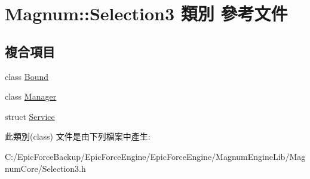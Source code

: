 \hypertarget{class_magnum_1_1_selection3}{}\section{Magnum\+:\+:Selection3 類別 參考文件}
\label{class_magnum_1_1_selection3}
\subsection*{複合項目}
\begin{DoxyCompactItemize}
\item 
class \hyperlink{class_magnum_1_1_selection3_1_1_bound}{Bound}
\item 
class \hyperlink{class_magnum_1_1_selection3_1_1_manager}{Manager}
\item 
struct \hyperlink{struct_magnum_1_1_selection3_1_1_service}{Service}
\end{DoxyCompactItemize}


此類別(class) 文件是由下列檔案中產生\+:\begin{DoxyCompactItemize}
\item 
C\+:/\+Epic\+Force\+Backup/\+Epic\+Force\+Engine/\+Epic\+Force\+Engine/\+Magnum\+Engine\+Lib/\+Magnum\+Core/Selection3.\+h\end{DoxyCompactItemize}
